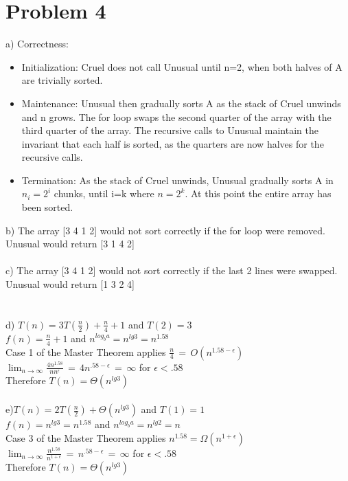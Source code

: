 \documentclass{article}
\begin{document}
\section*{Problem 4}
a) Correctness: 
\begin{itemize}
    \item Initialization: Cruel does not call Unusual until n=2, when both halves of A are trivially sorted. 
    
    \item Maintenance: Unusual then gradually sorts A as the stack of Cruel unwinds and n grows. The for loop swaps the second quarter of the array with the 
    third quarter of the array.  The recursive calls to Unusual maintain the invariant that each half is sorted, as the quarters are now 
    halves for the recursive calls.
    
    \item Termination: As the stack of Cruel unwinds, Unusual gradually sorts A in $n_i=2^i$ chunks, until i=k where $n=2^k$.  At this point the entire array
    has been sorted.
\end{itemize}
b) The array [3 4 1 2] would not sort correctly if the for loop were removed.  Unusual would return [3 1 4 2]\\\\
c) The array [3 4 1 2] would not sort correctly if the last 2 lines were swapped.  Unusual would return [1 3 2 4]\\\\\\
d) $T(n)=3T(\frac{n}{2})+\frac{n}{4}+1$ and $T(2)=3$\\
$f(n)=\frac{n}{4}+1$ and $n^{log_ba}=n^{lg3}=n^{1.58}$\\
Case 1 of the Master Theorem applies $\frac{n}{4}\,=\,O(n^{1.58-\epsilon})$\\
$\lim_{n \to \infty}\frac{4n^{1.58}}{nn^{\epsilon}}\,=\,4n^{.58-\epsilon}\,=\,\infty$ for $\epsilon<.58$\\
Therefore $T(n)=\Theta(n^{lg3})$\\\\
e)$T(n)=2T(\frac{n}{2})+\Theta(n^{lg3})$ and $T(1)=1$\\
$f(n)=n^{lg3}=n^{1.58}$ and $n^{log_ba}=n^{lg2}=n$\\
Case 3 of the Master Theorem applies $n^{1.58}=\Omega(n^{1+\epsilon})$\\
$\lim_{n \to \infty}\frac{n^{1.58}}{n^{1+\epsilon}}\,=\,n^{.58-\epsilon}\,=\,\infty$ for $\epsilon<.58$\\
Therefore $T(n)=\Theta(n^{lg3})$
\end{document}
